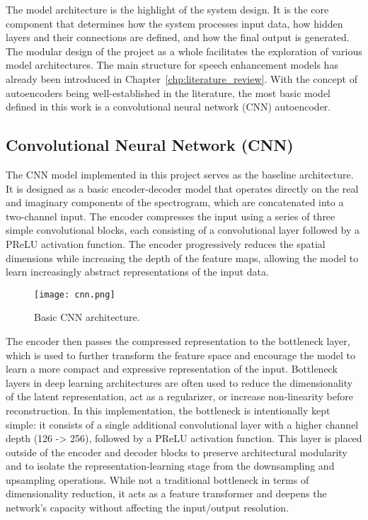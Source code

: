 The model architecture is the highlight of the system design. It is the core component that determines how the system processes input data, how hidden layers and their connections are defined, and how the final output is generated. The modular design of the project as a whole facilitates the exploration of various model architectures. The main structure for speech enhancement models has already been introduced in Chapter~\ref{chp:literature_review}. With the concept of autoencoders being well-established in the literature, the most basic model defined in this work is a convolutional neural network (CNN) autoencoder.

\subsection{Convolutional Neural Network (CNN)}

The CNN model implemented in this project serves as the baseline architecture. It is designed as a basic encoder-decoder model that operates directly on the real and imaginary components of the spectrogram, which are concatenated into a two-channel input. The encoder compresses the input using a series of three simple convolutional blocks, each consisting of a convolutional layer followed by a PReLU activation function. The encoder progressively reduces the spatial dimensions while increasing the depth of the feature maps, allowing the model to learn increasingly abstract representations of the input data.

\begin{figure}[h]
    \centering
    \texttt{[image: cnn.png]}
    \caption{\label{fig:cnn}Basic CNN architecture.}
\end{figure}

The encoder then passes the compressed representation to the bottleneck layer, which is used to further transform the feature space and encourage the model to learn a more compact and expressive representation of the input. Bottleneck layers in deep learning architectures are often used to reduce the dimensionality of the latent representation, act as a regularizer, or increase non-linearity before reconstruction. In this implementation, the bottleneck is intentionally kept simple: it consists of a single additional convolutional layer with a higher channel depth (126 -> 256), followed by a PReLU activation function. This layer is placed outside of the encoder and decoder blocks to preserve architectural modularity and to isolate the representation-learning stage from the downsampling and upsampling operations. While not a traditional bottleneck in terms of dimensionality reduction, it acts as a feature transformer and deepens the network's capacity without affecting the input/output resolution.

